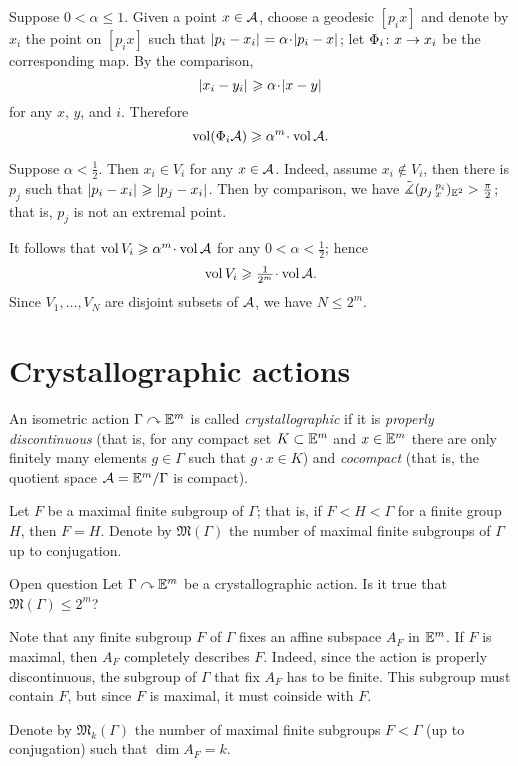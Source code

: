 Suppose  $0<\alpha\le 1$.
Given a point $x\in\mathcal{A}$, choose a geodesic $[p_ix]$ and denote by $x_i$ the point on $[p_ix]$ such that $\dist{p_i}{x_i}{}=\alpha\cdot\dist{p_i}{x}{}$;
let $\Phi_i\colon x\to x_i$ be the corresponding map.
By the comparison, 
\[\dist{x_i}{y_i}{}\ge\alpha\cdot \dist{x}{y}{}\]
for any $x$, $y$, and $i$.
Therefore 
\[\vol(\map_i \spc{A})\ge\alpha^m\cdot\vol \spc{A}.\]

Suppose $\alpha<\tfrac12$.
Then $x_i\in V_i$ for any $x\in \mathcal{A}$.
Indeed, assume $x_i\notin V_i$,
then there is $p_j$ such that $|{p_i}-{x_i}|_{}^{{}}\geqslant|{p_j}-{x_i}|_{}^{{}}$.
Then by comparison, we have $\tilde\measuredangle(p_j\,{}^{p_i}_{x})_{\mathbb{E}^2}>\tfrac\pi2$;
that is, $p_j$ is not an extremal point.

It follows that $\vol V_i\ge\alpha^m\cdot\vol \spc{A}$
for any $0<\alpha<\tfrac12$; hence 
\[\vol V_i\ge\tfrac1{2^m}\cdot\vol \spc{A}.\]
Since $V_1,\dots,V_N$ are disjoint subsets of $\mathcal{A}$, we have $N\le 2^m$.
\qeds


\section{Crystallographic actions}

An isometric action $\Gamma\curvearrowright \mathbb{E}^m$ is called \emph{crystallographic} if it is 
\emph{properly discontinuous} (that is, for any compact set $K\subset \mathbb{E}^m$ and $x\in \mathbb{E}^m$ there are only finitely many elements $g\in \Gamma$ such that $g\cdot x\in K$) and \emph{cocompact} (that is, the quotient space $\mathcal{A}=\mathbb{E}^m/\Gamma$ is compact).

Let $F$ be a maximal finite subgroup of $\Gamma$;
that is, if $F<H<\Gamma$ for a finite group $H$, then $F=H$.
Denote by $\mathfrak{M}(\Gamma)$ the number of maximal finite subgroups of $\Gamma$ up to conjugation.

\begin{thm}{Open question}
Let $\Gamma\curvearrowright \mathbb{E}^m$ be a crystallographic action.
Is it true that $\mathfrak{M}(\Gamma)\le 2^m$?
\end{thm}

Note that any finite subgroup $F$ of $\Gamma$ fixes an affine subspace $A_F$ in $\mathbb{E}^m$.
If $F$ is maximal, then $A_F$ completely describes $F$.
Indeed, since the action is properly discontinuous, the subgroup of $\Gamma$ that fix $A_F$ has to be finite.
This subgroup must contain $F$, but since $F$ is maximal, it must coinside with $F$. 

Denote by $\mathfrak{M}_k(\Gamma)$ the number of maximal finite subgroups $F<\Gamma$ (up to conjugation) such that $\dim A_F=k$.

